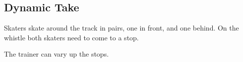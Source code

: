 \subsection*{Dynamic Take}
\label{drill:stopping:dynamic_take}

Skaters skate around the track in pairs, one in front, and one behind.
On the whistle both skaters need to come to a stop.

The trainer can vary up the stops.
